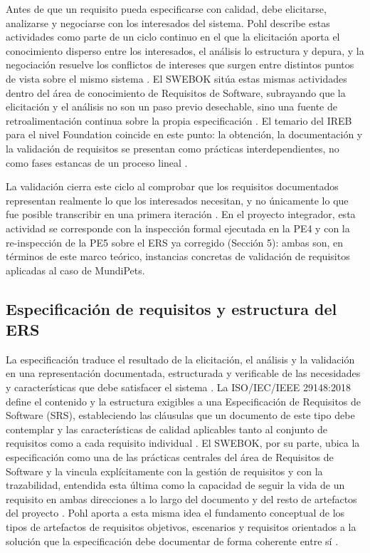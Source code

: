 \documentclass[journal,onecolumn]{IEEEtran}
\begin{document}
Antes de que un requisito pueda especificarse con calidad, debe elicitarse, analizarse y negociarse
con los interesados del sistema. Pohl describe estas actividades como parte de un ciclo continuo en el
que la elicitación aporta el conocimiento disperso entre los interesados, el análisis lo estructura y
depura, y la negociación resuelve los conflictos de intereses que surgen entre distintos puntos de
vista sobre el mismo sistema \cite{pohl2025}. El SWEBOK sitúa estas mismas actividades dentro del área
de conocimiento de Requisitos de Software, subrayando que la elicitación y el análisis no son un paso
previo desechable, sino una fuente de retroalimentación continua sobre la propia especificación
\cite{swebok2024}. El temario del IREB para el nivel Foundation coincide en este punto: la obtención,
la documentación y la validación de requisitos se presentan como prácticas interdependientes, no como
fases estancas de un proceso lineal \cite{ireb2026}.

La validación cierra este ciclo al comprobar que los requisitos documentados representan realmente lo
que los interesados necesitan, y no únicamente lo que fue posible transcribir en una primera
iteración \cite{ieee29148,pohl2025}. En el proyecto integrador, esta actividad se corresponde con la
inspección formal ejecutada en la PE4 y con la re-inspección de la PE5 sobre el ERS ya corregido
(Sección 5): ambas son, en términos de este marco teórico, instancias concretas de validación de
requisitos aplicadas al caso de MundiPets.

\subsection{Especificación de requisitos y estructura del ERS}

La especificación traduce el resultado de la elicitación, el análisis y la validación en una
representación documentada, estructurada y verificable de las necesidades y características que debe
satisfacer el sistema \cite{ieee29148}. La ISO/IEC/IEEE 29148:2018 define el contenido y la estructura
exigibles a una Especificación de Requisitos de Software (SRS), estableciendo las cláusulas que un
documento de este tipo debe contemplar y las características de calidad aplicables tanto al conjunto
de requisitos como a cada requisito individual \cite{ieee29148}. El SWEBOK, por su parte, ubica la
especificación como una de las prácticas centrales del área de Requisitos de Software y la vincula
explícitamente con la gestión de requisitos y con la trazabilidad, entendida esta última como la
capacidad de seguir la vida de un requisito en ambas direcciones a lo largo del documento y del resto
de artefactos del proyecto \cite{swebok2024}. Pohl aporta a esta misma idea el fundamento conceptual
de los tipos de artefactos de requisitos objetivos, escenarios y requisitos orientados a la
solución que la especificación debe documentar de forma coherente entre sí \cite{pohl2025}.
\end{document}

